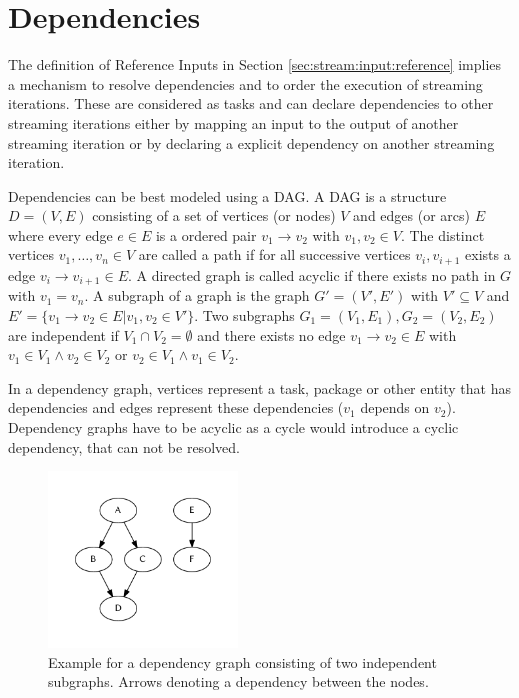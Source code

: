 	\section{Dependencies}
		\label{sec:stream:dependencies}
		The definition of Reference Inputs in Section \ref{sec:stream:input:reference} implies a mechanism to resolve dependencies and to order the execution of streaming iterations. These are considered as tasks and can declare dependencies to other streaming iterations either by mapping an input to the output of another streaming iteration or by declaring a explicit dependency on another streaming iteration.

		Dependencies can be best modeled using a \ac{DAG}. A \ac{DAG} is a structure $D=(V, E)$ consisting of a set of vertices (or nodes) $V$ and edges (or arcs) $E$ where every edge $e\in E$ is a ordered pair $v_1 \rightarrow v_2$ with $v_1, v_2 \in V$. The distinct vertices $v_1,\dots,v_n\in V$ are called a path if for all successive vertices $v_i, v_{i+1}$ exists a edge $v_i \rightarrow v_{i+1} \in E$. A directed graph is called acyclic if there exists no path in $G$ with $v_1 = v_n$. A subgraph of a graph is the graph $G' = (V', E')$ with $V'\subseteq V$ and $E' = \{v_1 \rightarrow v_2 \in E | v_1, v_2\in V'\}$. Two subgraphs $G_1 = (V_1, E_1), G_2 = (V_2, E_2)$ are independent if $V_1 \cap V_2 = \emptyset$ and there exists no edge $v_1\rightarrow v_2\in E$ with $v_1\in V_1 \wedge v_2\in V_2$ or $v_2\in V_1 \wedge v_1\in V_2$.

		In a dependency graph, vertices represent a task, package or other entity that has dependencies and edges represent these dependencies ($v_1$ depends on $v_2$). Dependency graphs have to be acyclic as a cycle would introduce a cyclic dependency, that can not be resolved.

		\begin{figure}[!htb]
			\centering
			\includegraphics[width=0.44694533762057875\textwidth]{figures/unordered-graph.pdf} %
			\caption{\label{fig:graph:unordered} Example for a dependency graph consisting of two independent subgraphs. Arrows denoting a dependency between the nodes.}
		\end{figure}

